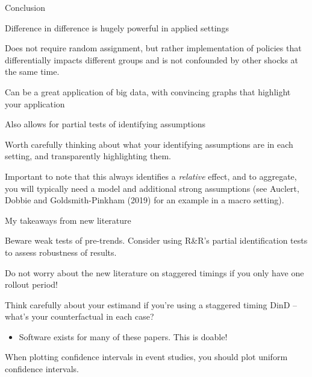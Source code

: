 \documentclass[notes,11pt, aspectratio=169]{beamer}
\newenvironment{wideitemize}{\itemize\addtolength{\itemsep}{10pt}}{\enditemize}
\begin{document}
\begin{frame}{Conclusion}
  \begin{wideitemize}
  \item Difference in difference is hugely powerful in applied settings
  \item Does not require random assignment, but rather implementation
    of policies that differentially impacts different groups and is
    not confounded by other shocks at the same time.
  \item Can be a great application of big data, with convincing graphs
    that highlight your application
  \item Also allows for partial tests of identifying assumptions
  \item Worth carefully thinking about what your identifying
    assumptions are in each setting, and transparently highlighting
    them.
  \item Important to note that this always identifies a
    \emph{relative} effect, and to aggregate, you will typically need
    a model and additional strong assumptions (see Auclert, Dobbie and
    Goldsmith-Pinkham (2019) for an example in a macro setting).
  \end{wideitemize}
\end{frame}

\begin{frame}{My takeaways from new literature}
  \begin{wideitemize}
  \item Beware weak tests of pre-trends. Consider using R\&R's
    partial identification tests to assess robustness of results. 
  \item Do not worry about the new literature on staggered timings if you only have one rollout period!
  \item Think carefully about your estimand if you're using a staggered timing DinD -- what's your counterfactual in each case?
    \begin{itemize}
    \item Software exists for many of these papers. This is doable!
    \end{itemize}
  \item When plotting confidence intervals in event studies, you should plot uniform confidence intervals.
  \end{wideitemize}
\end{frame}
\end{document}
